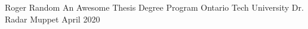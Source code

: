 

\usepackage{hyperref}
\hypersetup{
    colorlinks,
    citecolor=black,
    filecolor=black,
    linkcolor=black,
    urlcolor=black
}



\thesisTitle
  {Roger Random}
  {An Awesome Thesis}
  {Degree}
  {Program}
  {Ontario Tech University}
  {Dr. Radar Muppet}
  {April}
  {2020}




\singlespacing
\tableofcontents
\listoffigures
\listoftables
\lstlistoflistings
\printglossary[style=list]
\clearpage
\doublespacing














